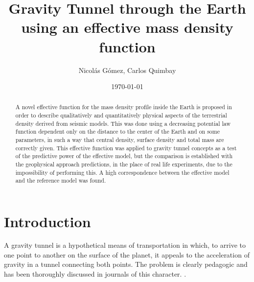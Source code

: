 \documentclass[aps,twocolumn,showpacs,preprintnumbers]{revtex4}
\begin{document}
\title{Gravity Tunnel through the Earth using  an effective mass density function}

\author{Nicolás Gómez, Carlos Quimbay}


\date{\today}

\begin{abstract}  



A novel effective function for the mass density profile inside the Earth is proposed in order to describe qualitatively and quantitatively physical aspects of the terrestrial density derived from seismic models. This was done using a decreasing potential law function dependent only on the distance to the center of the Earth and on some parameters, in such a way that central density, surface density and total mass are correctly given. This effective function was applied to gravity tunnel concepts as a test of the predictive power of the effective model, but the comparison is established with the geophysical approach predictions, in the place of real life experiments, due to the impossibility of performing this. A high correspondence between the effective model and the reference model was found. 

\end{abstract}


\maketitle 

\section{Introduction}

    A gravity tunnel is a hypothetical means of transportation in which, to arrive to one point to another on the surface of the planet, it appeals to the acceleration of gravity in a tunnel connecting both points. The problem is clearly pedagogic and has been thoroughly discussed in journals of this character. \citep{History-Tunels}. 
    
\end{document}
